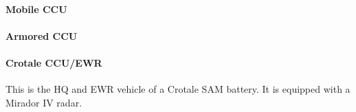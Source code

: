 

\paragraph{Mobile CCU}

\paragraph{Armored CCU}

\paragraph{Crotale CCU/EWR} This is the HQ and EWR vehicle of a Crotale SAM battery. It is equipped with a Mirador IV radar.

\begin{table}[p]
    \caption{Air-Defense Units: EWR and CCU Units}
    \centering
    \footnotesize
    
    \label{table:ccu-and-ewr-units}
\end{table}
